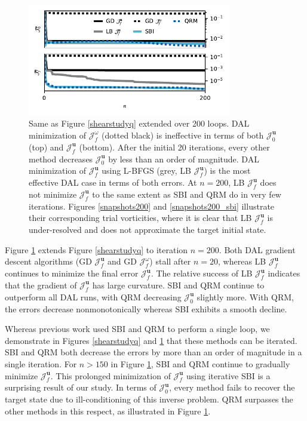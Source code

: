 \documentclass[%
 reprint,
 amsmath,amssymb,
 aps,
 pre,
]{revtex4-2}
\renewcommand{\vec}[1]{\boldsymbol{#1}}
\newcommand{\JUo}{\mathcal{J}^{\vec{u}}_0}
\newcommand{\JUf}{\mathcal{J}^{\vec{u}}_f}
\newcommand{\Jwf}{\mathcal{J}^{\omega}_f}
\begin{document}
\begin{figure}
  \includegraphics[width=3.5in]{PLT200DQ/both.pdf}
  \caption{Same as Figure \ref{shearstudyq} extended over 200 loops. 
  DAL minimization of $\Jwf$ (dotted black) is ineffective in terms of both $\JUo$ (top) and $\JUf$ (bottom).
  After the initial 20 iterations, every other method decreases $\JUo$ by less than an order of magnitude.
  DAL minimization of $\JUf$ using L-BFGS (grey, LB $\JUf$) is the most effective DAL case in terms of both errors.
  At $n=200$, LB $\JUf$ does not minimize $\JUf$ to the same extent as SBI and QRM do in very few iterations.
  Figures \ref{snapshots200} and \ref{snapshots200_sbi} illustrate their corresponding trial vorticities, where it is clear that LB $\JUf$ is under-resolved and does not approximate the target initial state.
  }
  \label{shearstudyq2}
\end{figure}

Figure \ref{shearstudyq2} extends Figure \ref{shearstudyq} to iteration $n=200$.
Both DAL gradient descent algorithms (GD $\JUf$ and GD $\Jwf$) stall after $n=20$, whereas LB $\JUf$ continues to minimize the final error $\JUf$.
The relative success of LB $\JUf$ indicates that the gradient of $\JUf$ has large curvature.
SBI and QRM continue to outperform all DAL runs, with QRM decreasing $\JUo$ slightly more.
With QRM, the errors decrease nonmonotonically whereas SBI exhibits a smooth decline.

Whereas previous work used SBI and QRM to perform a single loop, we demonstrate in Figures \ref{shearstudyq} and \ref{shearstudyq2} that these methods can be iterated.
SBI and QRM both decrease the errors by more than an order of magnitude in a single iteration.
For $n>150$ in Figure \ref{shearstudyq2}, SBI and QRM continue to gradually minimize $\JUf$.
This prolonged minimization of $\JUf$ using iterative SBI is a surprising result of our study.
In terms of $\JUo$, every method fails to recover the target state due to ill-conditioning of this inverse problem.
QRM surpasses the other methods in this respect, as illustrated in Figure \ref{shearstudyq2}.
\end{document}
